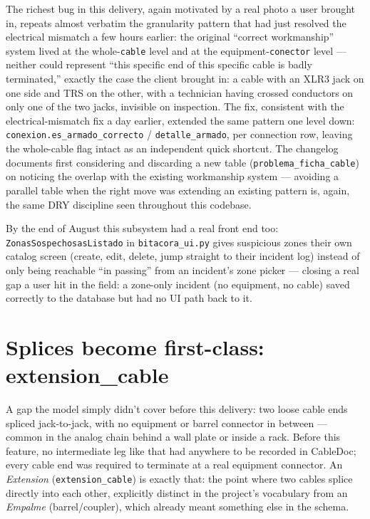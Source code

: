 \documentclass[10.4pt,twocolumn]{article}
\begin{document}
The richest bug in this delivery, again motivated by a real photo a user brought in, repeats almost verbatim the granularity pattern that had just resolved the electrical mismatch a few hours earlier: the original ``correct workmanship'' system lived at the whole-\texttt{cable} level and at the equipment-\texttt{conector} level --- neither could represent ``this specific end of this specific cable is badly terminated,'' exactly the case the client brought in: a cable with an XLR3 jack on one side and TRS on the other, with a technician having crossed conductors on only one of the two jacks, invisible on inspection. The fix, consistent with the electrical-mismatch fix a day earlier, extended the same pattern one level down: \texttt{conexion.es\_armado\_correcto} / \texttt{detalle\_armado}, per connection row, leaving the whole-cable flag intact as an independent quick shortcut. The changelog documents first considering and discarding a new table (\texttt{problema\_ficha\_cable}) on noticing the overlap with the existing workmanship system --- avoiding a parallel table when the right move was extending an existing pattern is, again, the same DRY discipline seen throughout this codebase.

By the end of August this subsystem had a real front end too: \texttt{ZonasSospechosasListado} in \texttt{bitacora\_ui.py} gives suspicious zones their own catalog screen (create, edit, delete, jump straight to their incident log) instead of only being reachable ``in passing'' from an incident's zone picker --- closing a real gap a user hit in the field: a zone-only incident (no equipment, no cable) saved correctly to the database but had no UI path back to it.

\section{Splices become first-class: extension\_cable}

A gap the model simply didn't cover before this delivery: two loose cable ends spliced jack-to-jack, with no equipment or barrel connector in between --- common in the analog chain behind a wall plate or inside a rack. Before this feature, no intermediate leg like that had anywhere to be recorded in CableDoc; every cable end was required to terminate at a real equipment connector. An \emph{Extension} (\texttt{extension\_cable}) is exactly that: the point where two cables splice directly into each other, explicitly distinct in the project's vocabulary from an \emph{Empalme} (barrel/coupler), which already meant something else in the schema.
\end{document}
